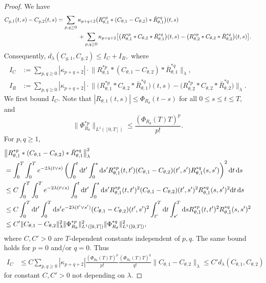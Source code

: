\begin{proof}
We have
\[
\begin{aligned}
  C_{g,1}(t,s)-C_{g,2}(t,s)
  &=
  \sum_{p,q\ge 0}
  \kappa_{p+q+2}
  \bigl(
    R_{\theta,1}^{\ast p}\ast (C_{\theta,1}-C_{\theta,2})
    \ast \bar R_{\theta,1}^{\ast q}
  \bigr)(t,s) \\
  &\hspace{0.5in}
  +
  \sum_{p,q\ge 0}
  \kappa_{p+q+2}
  \bigl[
    \bigl(R_{\theta,1}^{\ast p}\ast C_{\theta,2}\ast \bar R_{\theta,1}^{\ast q}\bigr)(t,s) -
    \bigl(R_{\theta,2}^{\ast p}\ast C_{\theta,2}\ast \bar R_{\theta,2}^{\ast q}\bigr)(t,s)
  \bigr].
\end{aligned}
\]
Consequently, 
\(
  d_\lambda(C_{g,1},C_{g,2}) \leq I_C+I_R,
\)
where
\begin{align*}
  I_C
  &:=\sum_{p,q\ge 0}
  |\kappa_{p+q+2}| \cdot
  \big\|
    R_{\theta,1}^{\ast p}\ast (C_{\theta,1}-C_{\theta,2})
    \ast \bar R_{\theta,1}^{\ast q}\big\|_\lambda,\\
  I_R
  &:=\sum_{p,q\ge 0}
  |\kappa_{p+q+2}| \cdot
  \big\|\bigl(R_{\theta,1}^{\ast p}\ast C_{\theta,2}\ast \bar R_{\theta,1}^{\ast
q}\bigr)(t,s)-\bigl(R_{\theta,2}^{\ast p}\ast C_{\theta,2}\ast \bar
R_{\theta,2}^{\ast q}\bigr)\big\|_\lambda.
\end{align*}
We first bound \(I_C\). Note that
$|R_{\theta,1}(t,s)|\le \Phi_{R_\theta}(t-s)$ for all $0\le s\le t\le T$, and
\[\|\Phi_{R_\theta}^{\ast p}\|_{L^1([0,T])}
\le \frac{(\Phi_{R_\theta}(T) T)^{p}}{p!}.\]
For $p,q \geq 1$,
\begin{align*}
&\big\|
    R_{\theta,1}^{\ast p}\ast (C_{\theta,1}-C_{\theta,2})
    \ast \bar R_{\theta,1}^{\ast q}\big\|_\lambda^2\\
    &=\int_0^T \int_0^T e^{-2\lambda(t \vee s)}
  \left(\int_0^t \mathrm{d} t'\int_0^s \mathrm{d} s'
  R_{\theta,1}^{*p}(t,t')
  (C_{\theta,1}-C_{\theta,2})(t',s')
  R_{\theta,1}^{*q}(s,s')\right)^2\mathrm{d} t\, \mathrm{d} s\\
  &\leq C \int_0^T \int_0^T e^{-2\lambda(t \vee s)}
  \int_0^t \mathrm{d} t'\int_0^s \mathrm{d} s'
  R_{\theta,1}^{*p}(t,t')^2
  (C_{\theta,1}-C_{\theta,2})(t',s')^2
  R_{\theta,1}^{*q}(s,s')^2\mathrm{d} t\, \mathrm{d} s\\
  &\leq C\int_0^T \mathrm{d} t'\int_0^T \mathrm{d} s'
  e^{-2\lambda(t' \vee s')}
  (C_{\theta,1}-C_{\theta,2})(t',s')^2
  \int_{t'}^T  \mathrm{d} t \int_{s'}^T \mathrm{d} s
  R_{\theta,1}^{*p}(t,t')^2
  R_{\theta,1}^{*q}(s,s')^2\\
  &\leq C'\|C_{\theta,1}-C_{\theta,2}\|_\lambda^2 \|\Phi_{R_\theta}^{*p}\|_{L^1([0,T])}^2
  \|\Phi_{R_\theta}^{*q}\|_{L^1([0,T])}^2,
\end{align*}
where $C,C'>0$ are $T$-dependent constants independent of $p,q$. The same bound holds for $p=0$ and/or $q=0$. Thus
\begin{align*}
  I_C 
  &\le C\sum_{p,q\ge 0} |\kappa_{p+q+2}| \frac{(\Phi_{R_\theta}(T) T)^p}{p!} \frac{(\Phi_{R_\theta}(T) T)^q}{q!} \|C_{\theta,1}-C_{\theta,2}\|_\lambda
\leq C'd_\lambda(C_{\theta,1},C_{\theta,2})
\end{align*}
for constant $C,C'>0$ not depending on $\lambda$.


\end{proof}
